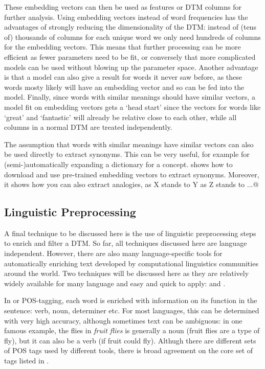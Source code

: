 These embedding vectors can then be used as features or DTM columns for further analysis.
Using embedding vectors instead of word frequencies has the advantages of strongly reducing the dimensionality of the DTM:
instead of (tens of) thousands of columns for each unique word we only need hundreds of columns for the embedding vectors.
This means that further processing can be more efficient as fewer parameters need to be fit,
or conversely that more complicated models can be used without blowing up the parameter space.
Another advantage is that a model can also give a result for words it never saw before, as these words mosty likely will have an embedding vector and so can be fed into the model.
Finally, since words with similar meanings should have similar vectors,
a model fit on embedding vectors gets a `head start' since the vectors for words like `great' and `fantastic' will already be relative close to each other, while all columns in a normal DTM are treated independently.

The assumption that words with similar meanings have similar vectors can also be used directly to extract synonyms.
This can be very useful, for example for (semi-)automatically expanding a dictionary for a concept.
 shows how to download and use pre-trained embedding vectors to extract synonyms.
Moreover, it shows how you can also extract analogies, as X stands to Y as Z stands to ...@



\subsection{Linguistic Preprocessing}

A final technique to be discussed here is the use of linguistic preprocessing steps to enrich and filter a DTM.
So far, all techniques discussed here are language independent.
However, there are also many language-specific tools for automatically enriching text developed by computational linguistics communities around the world.
Two techniques will be discussed here as they are relatively widely available for many language and easy and quick to apply:  and .

In  or POS-tagging, each word is enriched with information on its function in the sentence: verb, noun, determiner etc.
For most languages, this can be determined with very high accuracy, although sometimes text can be ambiguous:
in one famous example, the flies in \emph{fruit flies} is generally a noun (fruit flies are a type of fly), but it can also be a verb (if fruit could fly). 
Althugh there are different sets of POS tags used by different tools, there is broad agreement on the core set of tags listed in .

